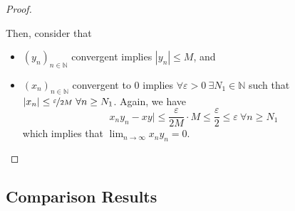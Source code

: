 \documentclass{article}
\newcommand{\N}{\mathbb{N}}
\newcommand{\seq}[2]{(#1_{#2})_{#2 \in \N}}
\newcommand{\?}{\stackrel{?}{=}}
\begin{document}
\begin{itemize}
\begin{proof}
\begin{itemize}
            Then, consider that
            \begin{itemize}
                \item $\seq{y}{n}$ convergent implies $|y_n| \leq M$, and
                \item $\seq{x}{n}$ convergent to 0 implies $\forall \varepsilon > 0 \ \exists N_1 \in \N$ such that $|x_n| \leq \nicefrac{\varepsilon}{2M} \ \forall n \geq N_1$. Again, we have
                $$x_ny_n - xy| \leq \frac{\varepsilon}{2M} \cdot M \leq \frac{\varepsilon}{2} \leq \varepsilon \ \forall n \geq N_1$$
                which implies that $\lim_{n \to \infty} x_ny_n = 0$.
            \end{itemize}
        \end{itemize}
    \end{proof}
\end{itemize}

\subsection{Comparison Results}
\end{document}
